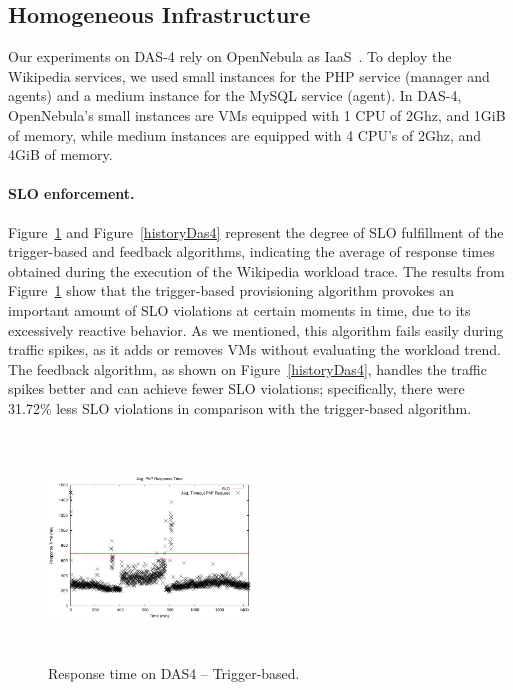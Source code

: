 
\subsection*{Homogeneous Infrastructure}

Our experiments on DAS-4 rely on OpenNebula as
IaaS~\cite{sotomayor_virtual_2009}. To deploy the Wikipedia services,
we used small instances for the PHP service (manager and agents) and a
medium instance for the MySQL service (agent). In DAS-4, OpenNebula's
small instances are VMs equipped with 1 CPU of 2Ghz, and 1GiB of
memory, while medium instances are equipped with 4 CPU's of 2Ghz, and
4GiB of memory.

\paragraph{SLO enforcement.}
Figure~\ref{naiveDas4} and Figure~\ref{historyDas4} represent the
degree of SLO fulfillment of the trigger-based and feedback
algorithms, indicating the average of response times obtained during
the execution of the Wikipedia workload trace. The results from
Figure~\ref{naiveDas4} show that the trigger-based provisioning
algorithm provokes an important amount of SLO violations at certain
moments in time, due to its excessively reactive behavior. As we
mentioned, this algorithm fails easily during traffic spikes, as it
adds or removes VMs without evaluating the workload trend. The
feedback algorithm, as shown on Figure~\ref{historyDas4}, handles the
traffic spikes better and can achieve fewer SLO violations;
specifically, there were 31.72\% less SLO violations in comparison
with the trigger-based algorithm.


\begin{figure}[t]
\begin{center}
\includegraphics[width=0.49\textwidth, height=6cm]{./images/homogeneous/avgTimeout_PhP_trigger}
\end{center}
\vspace{-5mm}
\caption{Response time on DAS4 -- Trigger-based.}
\label{naiveDas4}
\end{figure}

